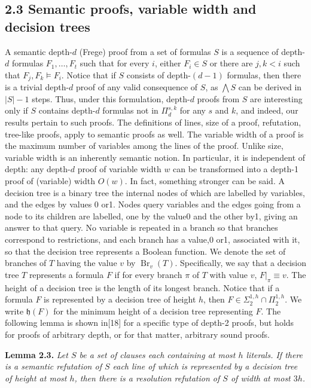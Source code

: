 \documentclass[10pt,a4paper]{article}
\newcommand{\Br}{\operatorname{Br}}
\newcommand{\height}{\mathfrak h}
\newenvironment{originalresult}[1]{\par\medskip\noindent\textbf{#1.}\itshape}{\par\medskip}
\begin{document}
\subsection*{2.3 Semantic proofs, variable width and decision trees}
A semantic depth-$d$ (Frege) proof from a set of formulas $S$ is a sequence of depth-$d$ formulas $F_1,\ldots,F_t$ such that for every $i$, either $F_i\in S$ or there are $j,k<i$ such that $F_j,F_k\models F_i$. Notice that if $S$ consists of depth-$(d-1)$ formulas, then there is a trivial depth-$d$ proof of any valid consequence of $S$, as $\bigwedge S$ can be derived in $|S|-1$ steps. Thus, under this formulation, depth-$d$ proofs from $S$ are interesting only if $S$ contains depth-$d$ formulas not in $\Pi_d^{s,k}$ for any $s$ and $k$, and indeed, our results pertain to such proofs.
The definitions of lines, size of a proof, refutation, tree-like proofs, apply to semantic proofs as well. The variable width of a proof is the maximum number of variables among the lines of the proof.
Unlike size, variable width is an inherently semantic notion. In particular, it is independent of depth: any depth-$d$ proof of variable width $w$ can be transformed into a depth-1 proof of (variable) width $O(w)$. In fact, something stronger can be said. A decision tree is a binary tree the internal nodes of which are labelled by variables, and the edges by values 0 or1. Nodes query variables and the edges going from a node to its children are labelled, one by the value0 and the other by1, giving an answer to that query. No variable is repeated in a branch so that branches correspond to restrictions, and each branch has a value,0 or1, associated with it, so that the decision tree represents a Boolean function. We denote the set of branches of $T$ having the value $v$ by $\Br_v(T)$. Specifically, we say that a decision tree $T$ represents a formula $F$ if for every branch $\pi$ of $T$ with value $v$, $F|_\pi\equiv v$. The height of a decision tree is the length of its longest branch. Notice that if a formula $F$ is represented by a decision tree of height $h$, then $F\in\Sigma_2^{1,h}\cap\Pi_2^{1,h}$. We write $\height(F)$ for the minimum height of a decision tree representing $F$. The following lemma is shown in[18] for a specific type of depth-2 proofs, but holds for proofs of arbitrary depth, or for that matter, arbitrary sound proofs.
\begin{originalresult}{Lemma 2.3}
Let $S$ be a set of clauses each containing at most $h$ literals. If there is a semantic refutation of $S$ each line of which is represented by a decision tree of height at most $h$, then there is a resolution refutation of $S$ of width at most $3h$.
\end{originalresult}
\end{document}
